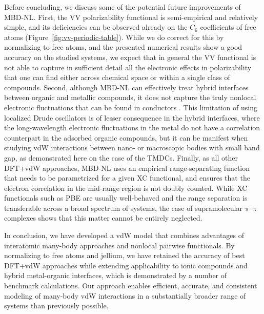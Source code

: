 Before concluding, we discuss some of the potential future improvements of MBD-NL\@.
First, the VV polarizability functional is semi-empirical and relatively simple, and its deficiencies can be observed already on the $C_6$ coefficients of free atoms (Figure~\ref{fig:vv-periodic-table}).
While we do correct for this by normalizing to free atoms, and the presented numerical results show a good accuracy on the studied systems, we expect that in general the VV functional is not able to capture in sufficient detail all the electronic effects in polarizability that one can find either across chemical space or within a single class of compounds.
Second, although MBD-NL can effectively treat hybrid interfaces between organic and metallic compounds, it does not capture the truly nonlocal electronic fluctuations that can be found in conductors \citep{DobsonIJQC14}.
This limitation of using localized Drude oscillators is of lesser consequence in the hybrid interfaces, where the long-wavelength electronic fluctuations in the metal do not have a correlation counterpart in the adsorbed organic compounds, but it can be manifest when studying vdW interactions between nano- or macroscopic bodies with small band gap, as demonstrated here on the case of the TMDCs.
Finally, as all other DFT+vdW approaches, MBD-NL uses an empirical range-separating function that needs to be parametrized for a given XC functional, and ensures that the electron correlation in the mid-range region is not doubly counted.
While XC functionals such as PBE are usually well-behaved and the range separation is transferable across a broad spectrum of systems, the case of supramolecular $\mathrm\pi$--$\mathrm\pi$ complexes shows that this matter cannot be entirely neglected.


In conclusion, we have developed a vdW model that combines advantages of interatomic many-body approaches and nonlocal pairwise functionals.
By normalizing to free atoms and jellium, we have retained the accuracy of best DFT+vdW approaches while extending applicability to ionic compounds and hybrid metal-organic interfaces, which is demonstrated by a number of benchmark calculations.
Our approach enables efficient, accurate, and consistent modeling of many-body vdW interactions in a substantially broader range of systems than previously possible.
